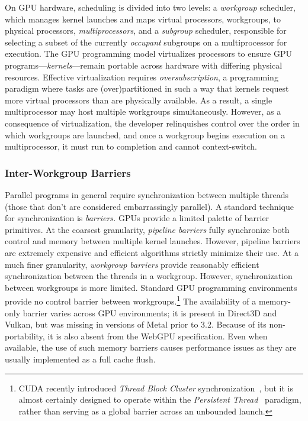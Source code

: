 \documentclass[sigconf,screen]{acmart}
\begin{document}
On GPU hardware, scheduling is divided into two levels: a \emph{workgroup} scheduler, which manages kernel launches and maps virtual processors, workgroups, to physical processors, \emph{multiprocessors}, and a \emph{subgroup} scheduler, responsible for selecting a subset of the currently \emph{occupant} subgroups on a multiprocessor for execution. The GPU programming model virtualizes processors to ensure GPU programs---\emph{kernels}---remain portable across hardware with differing physical resources. Effective virtualization requires \emph{oversubscription}, a programming paradigm where tasks are (over)partitioned in such a way that kernels request more virtual processors than are physically available. As a result, a single multiprocessor may host multiple workgroups simultaneously. However, as a consequence of virtualization, the developer relinquishes control over the order in which workgroups are launched, and once a workgroup begins execution on a multiprocessor, it must run to completion and cannot context-switch.

\subsubsection{Inter-Workgroup Barriers}
Parallel programs in general require synchronization between multiple threads (those that don't are considered embarrassingly parallel). A standard technique for synchronization is \emph{barriers.} GPUs provide a limited palette of barrier primitives. At the coarsest granularity, \emph{pipeline barriers} fully synchronize both control and memory between multiple kernel launches. However, pipeline barriers are extremely expensive and efficient algorithms strictly minimize their use. At a much finer granularity, \emph{workgroup barriers} provide reasonably efficient synchronization between the threads in a workgroup. However, synchronization between workgroups is more limited. Standard GPU programming environments provide no control barrier between workgroups.\footnote{CUDA recently introduced \emph{Thread Block Cluster} synchronization~\cite{NvidiaCudaGuide}, but it is almost certainly designed to operate within the \emph{Persistent Thread}~\cite{gupta2012} paradigm, rather than serving as a global barrier across an unbounded launch.} The availability of a memory-only barrier varies across GPU environments; it is present in Direct3D and Vulkan, but was missing in versions of Metal prior to 3.2. Because of its non-portability, it is also absent from the WebGPU specification. Even when available, the use of such memory barriers causes performance issues as they are usually implemented as a full cache flush.
\end{document}
